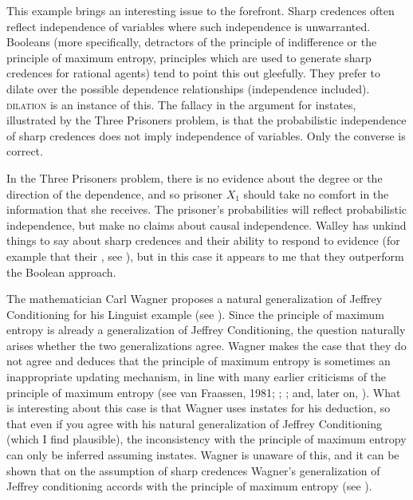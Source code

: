 \documentclass[11pt]{article}
\begin{document}
This example brings an interesting issue to the forefront. Sharp
credences often reflect independence of variables where such
independence is unwarranted. Booleans (more specifically, detractors
of the principle of indifference or the principle of maximum entropy,
principles which are used to generate sharp credences for rational
agents) tend to point this out gleefully. They prefer to dilate over
the possible dependence relationships (independence included).
\textsc{dilation} is an instance of this. The fallacy in the argument
for instates, illustrated by the Three Prisoners problem, is that the
probabilistic independence of sharp credences does not imply
independence of variables. Only the converse is correct.

In the Three Prisoners problem, there is no evidence about the degree
or the direction of the dependence, and so prisoner $X_{1}$ should
take no comfort in the information that she receives. The prisoner's
probabilities will reflect probabilistic independence, but make no
claims about causal independence. Walley has unkind things to say
about sharp credences and their ability to respond to evidence (for
example that their , see
), but in this case it appears to me that they
outperform the Boolean approach.


The mathematician Carl Wagner proposes a natural generalization of
Jeffrey Conditioning for his Linguist example (see
). Since the principle of maximum entropy is
already a generalization of Jeffrey Conditioning, the question
naturally arises whether the two generalizations agree. Wagner makes
the case that they do not agree and deduces that the principle of
maximum entropy is sometimes an inappropriate updating mechanism, in
line with many earlier criticisms of the principle of maximum entropy
(see van Fraassen, 1981;
; ; and, later on,
). What is interesting about this case is
that Wagner uses instates for his deduction, so that even if you agree
with his natural generalization of Jeffrey Conditioning (which I find
plausible), the inconsistency with the principle of maximum entropy
can only be inferred assuming instates. Wagner is unaware of this, and
it can be shown that on the assumption of sharp credences Wagner's
generalization of Jeffrey conditioning accords with the principle of
maximum entropy (see ).
\end{document}

